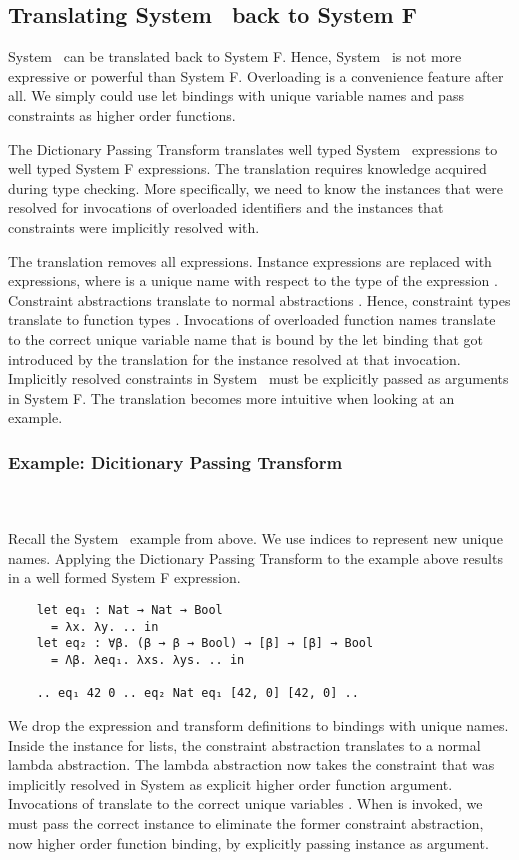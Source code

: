 \subsection{Translating System \Fo\ back to System F}
System \Fo\ can be translated back to System F. Hence, System \Fo\ is not more expressive or powerful than System F. Overloading is a convenience feature after all. We simply could use let bindings with unique variable names and pass constraints as higher order functions.

\noindent The Dictionary Passing Transform translates well typed System \Fo\ expressions to well typed System F expressions. The translation requires knowledge acquired during type checking. More specifically, we need to know the instances that were resolved for invocations of overloaded identifiers and the instances that constraints were implicitly resolved with.

\noindent The translation removes all  expressions. Instance expressions  are replaced with  expressions, where  is a unique name with respect to the type  of the expression . 
Constraint abstractions  translate to normal abstractions . 
Hence, constraint types  translate to function types . 
Invocations of overloaded function names  translate to the correct unique variable name  that is bound by the let binding that got introduced by the translation for the instance resolved at that invocation.
Implicitly resolved constraints in System \Fo\ must be explicitly passed as arguments in System F. The translation becomes more intuitive when looking at an example.

\subsubsection{Example: Dicitionary Passing Transform}\hfill\\\\
Recall the System \Fo\ example from above. We use indices to represent new unique names.
Applying the Dictionary Passing Transform to the example above results in a well formed System F expression.
\begin{verbatim}
    let eq₁ : Nat → Nat → Bool 
      = λx. λy. .. in
    let eq₂ : ∀β. (β → β → Bool) → [β] → [β] → Bool 
      = Λβ. λeq₁. λxs. λys. .. in
    
    .. eq₁ 42 0 .. eq₂ Nat eq₁ [42, 0] [42, 0] .. 
\end{verbatim}
We drop the \inl{|\Decl|}expression and transform \inl{|\Inst|}definitions to  bindings with unique names. 
Inside the instance for lists, the constraint abstraction translates to a normal lambda abstraction. The lambda abstraction now takes the constraint that was implicitly resolved in System \Fo as explicit higher order function argument.
Invocations of  translate to the correct unique variables .
When  is invoked, we must pass the correct instance to eliminate the former constraint abstraction, now higher order function binding, by explicitly passing instance  as argument.

